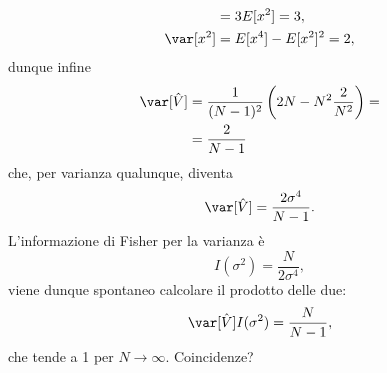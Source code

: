 \begin{solution}
\begin{align*}
		&= 3E[x^2] = 3, \\
		\var[x^2]
		&= E[x^4] - E[x^2]^2
		= 2,
	\end{align*}
	dunque infine
	\begin{align*}
		\var[\hat V]
		&= \frac1{(N-1)^2} \left( 2N - N^2 \frac2{N^2} \right) = \\
		&= \frac2{N-1}
	\end{align*}
	che, per varianza qualunque, diventa
	\begin{equation*}
		\var[\hat V]
		= \frac{2\sigma^4}{N-1}.
	\end{equation*}
	L'informazione di Fisher per la varianza è
	\begin{equation*}
		I(\sigma^2)
		= \frac N{2\sigma^4},
	\end{equation*}
	viene dunque spontaneo calcolare il prodotto delle due:
	\begin{equation*}
		\var[\hat V]I(\sigma^2)
		= \frac N{N-1},
	\end{equation*}
    che tende a 1 per $N\to\infty$. Coincidenze?
\end{solution}
